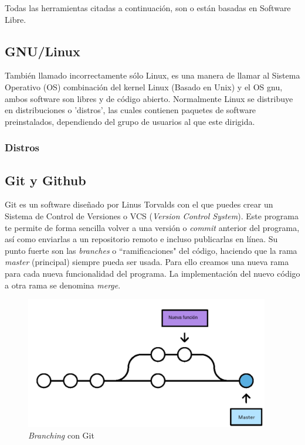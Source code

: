 \documentclass[a4paper, 11pt]{report} %
\begin{document}
Todas las herramientas citadas a continuación, son o están basadas en Software Libre.

\subsection{GNU/Linux}
También llamado incorrectamente sólo Linux, es una manera de llamar al Sistema Operativo (OS) combinación del kernel Linux (Basado en Unix) y el OS \gls{gnu}, ambos software son libres y de código abierto. Normalmente Linux se distribuye en distribuciones o 'distros', las cuales contienen paquetes de software preinstalados, dependiendo del grupo de usuarios al que este dirigida.

\subsubsection*{Distros}

\subsection{Git y Github}
Git es un software diseñado por Linus Torvalds con el que puedes crear un Sistema de Control de Versiones o VCS (\textit{Version Control System}). Este programa te permite de forma sencilla volver a una versión o \textit{commit} anterior del programa, así como enviarlas a un repositorio remoto e incluso publicarlas en línea. Su punto fuerte son las \textit{branches} o ``ramificaciones" del código, haciendo que la rama \textit{master} (principal) siempre pueda ser usada. Para ello creamos una nueva rama para cada nueva funcionalidad del programa. La implementación del nuevo código a otra rama se denomina \textit{merge}.

\begin{figure}
\noindent
\includegraphics[width=0.95\textwidth]{Resources/01.01.02-01.png}
\caption{\textit{Branching} con Git}
\end{figure}
\end{document}
